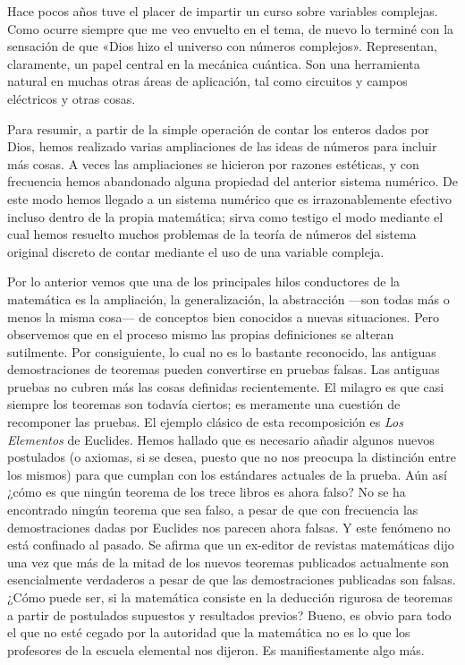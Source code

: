 \documentclass[a4paper, 12pt]{article}
\begin{document}
 

Hace pocos años tuve el placer de impartir un curso sobre variables complejas. Como ocurre siempre que me veo envuelto en el tema, de nuevo lo terminé con la sensación de que «Dios hizo el universo con números complejos». Representan, claramente, un papel central en la mecánica cuántica. Son una herramienta natural en muchas otras áreas de aplicación, tal como circuitos y campos  eléctricos y otras cosas.

 

Para resumir, a partir de la simple operación de contar los enteros dados por Dios, hemos realizado varias ampliaciones de las ideas de números para incluir más cosas. A veces las ampliaciones se hicieron por razones estéticas, y con frecuencia hemos abandonado alguna propiedad del anterior sistema numérico. De este modo hemos llegado a un sistema numérico que es irrazonablemente efectivo incluso dentro de la propia matemática; sirva como testigo el modo mediante el cual hemos resuelto muchos problemas de la teoría de números del sistema original discreto de contar mediante el uso de una variable compleja.

 

Por lo anterior vemos que una de los principales hilos conductores de la matemática es la ampliación, la generalización, la abstracción ---son todas más o menos la misma cosa--- de conceptos bien conocidos a nuevas situaciones. Pero observemos que en el proceso mismo las propias definiciones se alteran sutilmente. Por consiguiente, lo cual no es lo bastante reconocido, las antiguas demostraciones de teoremas pueden convertirse en pruebas falsas. Las antiguas pruebas no cubren más las cosas definidas recientemente. El milagro es que casi siempre los teoremas son todavía ciertos; es meramente una cuestión de recomponer las pruebas. El ejemplo clásico de esta recomposición es {\it Los Elementos} de Euclides. Hemos hallado que es necesario añadir algunos nuevos postulados (o axiomas, si se desea, puesto que no nos preocupa la distinción entre los mismos) para que cumplan con los estándares actuales de la prueba. Aún así ¿cómo es que ningún teorema de los trece libros es ahora falso? No se ha encontrado ningún teorema que sea falso, a pesar de que con frecuencia las demostraciones dadas por Euclides nos parecen ahora falsas. Y este fenómeno no está confinado al pasado. Se afirma que un ex-editor de revistas matemáticas dijo una vez que más de la mitad de los nuevos teoremas publicados actualmente son esencialmente verdaderos a pesar de que las demostraciones publicadas son falsas. ¿Cómo puede ser, si la matemática consiste en la deducción rigurosa de teoremas a partir de postulados supuestos y resultados previos? Bueno, es obvio para todo el que no esté cegado por la autoridad que la matemática no es lo que los profesores de la escuela elemental nos dijeron. Es manifiestamente algo más.
\end{document}
